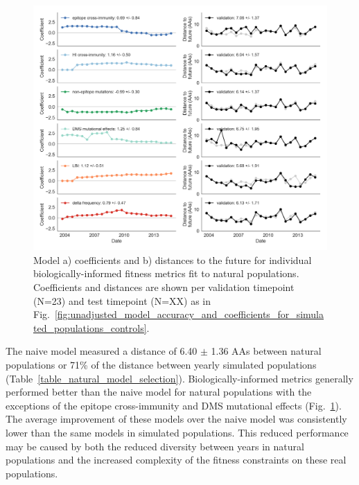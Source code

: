 \begin{figure}[ht]
  \begin{center}
  \includegraphics[width=\textwidth]{figures/unadjusted-model-accuracy-and-coefficients-for-natural-populations.png}
  \caption{
    Model a) coefficients and b) distances to the future for individual biologically-informed fitness metrics fit to natural populations.
    Coefficients and distances are shown per validation timepoint (N=23) and test timepoint (N=XX) as in Fig.~\ref{fig:unadjusted_model_accuracy_and_coefficients_for_simulated_populations_controls}.
  }
  \label{fig:unadjusted_model_accuracy_and_coefficients_for_natural_populations}
  \end{center}
\end{figure}

The naive model measured a distance of 6.40 $\pm$ 1.36 AAs between natural populations or 71\% of the distance between yearly simulated populations (Table~\ref{table_natural_model_selection}).
Biologically-informed metrics generally performed better than the naive model for natural populations with the exceptions of the epitope cross-immunity and DMS mutational effects (Fig.~\ref{fig:unadjusted_model_accuracy_and_coefficients_for_natural_populations}).
The average improvement of these models over the naive model was consistently lower than the same models in simulated populations.
This reduced performance may be caused by both the reduced diversity between years in natural populations and the increased complexity of the fitness constraints on these real populations.

